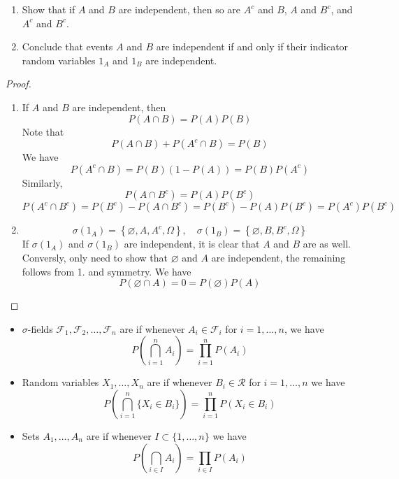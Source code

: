 \documentclass[../main.tex]{subfiles}
\begin{document}
\begin{exercise}{}{}
\begin{enumerate}
    \item Show that if $A$ and $B$ are independent, then so are $A^c$ and $B$, $A$ and $B^c$, and $A^c$ and $B^c$.
    \item Conclude that events $A$ and $B$ are independent if and only if their indicator random variables $1_A$ and $1_B$ are independent.
\end{enumerate}
\end{exercise}
\begin{proof}
    \begin{enumerate}
        \item If \(  A  \) and \(  B  \) are independent, then \[
        P\left( A\cap B \right)= P\left( A \right)P\left( B \right)   
        \]   Note that \[
        P\left( A\cap B \right)+ P\left( A^{c}\cap B \right)= P\left( B \right)   
        \] We have \[
        P\left( A^{c}\cap B \right)= P\left( B \right)\left( 1-P\left( A \right)  \right)= P\left( B \right)P\left( A^{c} \right)     
        \]  Similarly, \[
        P\left( A\cap B^{c} \right)= P\left( A \right)P\left( B^{c} \right)   
        \] \[
        P\left( A^{c}\cap B^{c} \right)= P\left( B^{c} \right)-P\left( A\cap B^{c} \right)= P\left( B^{c} \right)- P\left( A \right)P\left( B^{c} \right)= P\left( A^{c} \right)P\left( B^{c} \right)        
        \]
        \item  \[
         \sigma \left( 1_{A} \right)= \left\{ \varnothing,A, A^{c}, \Omega  \right\} ,\quad  \sigma \left( 1_{B} \right)= \left\{ \varnothing,B,B^{c}, \Omega  \right\} 
        \] If \(   \sigma \left( 1_{A} \right)   \) and \(   \sigma \left( 1_{B} \right)   \) are independent, it is clear that \(  A  \) and \(  B  \) are as well.  Conversly, only need to show that  \(  \varnothing  \) and \(  A  \) are independent, the remaining follows from 1. and symmetry.        We have \[
        P\left( \varnothing \cap A \right) = 0=  P\left( \varnothing \right)P\left( A \right)   
        \]
    \end{enumerate}
    
\end{proof}

\begin{definition}{}{}
    \begin{itemize}
        \item $\sigma$-fields $\mathcal{F}_1, \mathcal{F}_2, \dots, \mathcal{F}_n$ are  if whenever $A_i \in \mathcal{F}_i$ for $i = 1, \dots, n$, we have
\[
P \left(\bigcap_{i=1}^n A_i\right) = \prod_{i=1}^n P(A_i)
\]
\item 
Random variables $X_1, \dots, X_n$ are  if whenever $B_i \in \mathcal{R}$ for $i = 1, \dots, n$ we have
\[
P \left(\bigcap_{i=1}^n \{X_i \in B_i\}\right) = \prod_{i=1}^n P(X_i \in B_i)
\]
\item Sets $A_1, \dots, A_n$ are  if whenever $I \subset \{1, \dots, n\}$ we have
\[
P \left(\bigcap_{i \in I} A_i\right) = \prod_{i \in I} P(A_i)
\]
    \end{itemize}
\end{definition}
\end{document}
